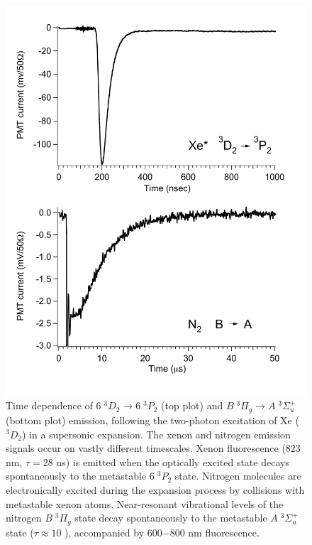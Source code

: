 \begin{figure}
  \caption{Time dependence of  $6\;^3D_2 \rightarrow 6\;^3P_2$
    (top plot) and  $B \; ^3\Pi_g \rightarrow A \;
    ^3\Sigma_u^+$ (bottom plot) emission, following the two-photon
    excitation of Xe ($^3D_2$) in a supersonic expansion.  The xenon
    and nitrogen emission signals occur on vastly different
    timescales.  Xenon fluorescence (823 nm, $\tau=28$ ns) is emitted
    when the optically excited state decays spontaneously to the
    metastable $6\;^3P_2$ state.  Nitrogen molecules are
    electronically excited during the expansion process by collisions
    with metastable xenon atoms.  Near-resonant vibrational levels of
    the nitrogen $B \; ^3\Pi_g$ state decay spontaneously to the
    metastable $A \; ^3\Sigma_u^+$ state ($\tau \approx 10$
    \microsec), accompanied by 600$-$800 nm fluorescence.}
  \label{fig:xen2-traces}
  \centering
  \includegraphics[width=5.5in]{xen2-timescales.pdf}
\end{figure}

